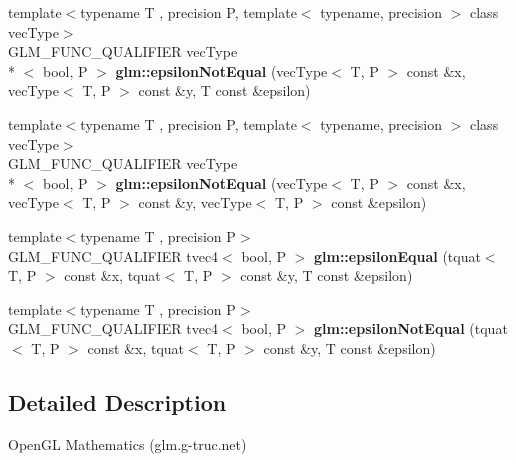 \begin{DoxyCompactItemize}
\item 
\hypertarget{namespaceglm_a76da74051c42eebf3256cd31464fa043}{{\footnotesize template$<$typename T , precision P, template$<$ typename, precision $>$ class vec\-Type$>$ }\\G\-L\-M\-\_\-\-F\-U\-N\-C\-\_\-\-Q\-U\-A\-L\-I\-F\-I\-E\-R vec\-Type\\*
$<$ bool, P $>$ {\bfseries glm\-::epsilon\-Not\-Equal} (vec\-Type$<$ T, P $>$ const \&x, vec\-Type$<$ T, P $>$ const \&y, T const \&epsilon)}\label{namespaceglm_a76da74051c42eebf3256cd31464fa043}

\item 
\hypertarget{namespaceglm_a34387d61360bf88bcca96b797f53e49d}{{\footnotesize template$<$typename T , precision P, template$<$ typename, precision $>$ class vec\-Type$>$ }\\G\-L\-M\-\_\-\-F\-U\-N\-C\-\_\-\-Q\-U\-A\-L\-I\-F\-I\-E\-R vec\-Type\\*
$<$ bool, P $>$ {\bfseries glm\-::epsilon\-Not\-Equal} (vec\-Type$<$ T, P $>$ const \&x, vec\-Type$<$ T, P $>$ const \&y, vec\-Type$<$ T, P $>$ const \&epsilon)}\label{namespaceglm_a34387d61360bf88bcca96b797f53e49d}

\item 
\hypertarget{namespaceglm_a9573ceefb3bf8f199bd920f2a7ffa4cb}{{\footnotesize template$<$typename T , precision P$>$ }\\G\-L\-M\-\_\-\-F\-U\-N\-C\-\_\-\-Q\-U\-A\-L\-I\-F\-I\-E\-R tvec4$<$ bool, P $>$ {\bfseries glm\-::epsilon\-Equal} (tquat$<$ T, P $>$ const \&x, tquat$<$ T, P $>$ const \&y, T const \&epsilon)}\label{namespaceglm_a9573ceefb3bf8f199bd920f2a7ffa4cb}

\item 
\hypertarget{namespaceglm_a1fcc8ab0db03be6e6c6c375b170c1f79}{{\footnotesize template$<$typename T , precision P$>$ }\\G\-L\-M\-\_\-\-F\-U\-N\-C\-\_\-\-Q\-U\-A\-L\-I\-F\-I\-E\-R tvec4$<$ bool, P $>$ {\bfseries glm\-::epsilon\-Not\-Equal} (tquat$<$ T, P $>$ const \&x, tquat$<$ T, P $>$ const \&y, T const \&epsilon)}\label{namespaceglm_a1fcc8ab0db03be6e6c6c375b170c1f79}

\end{DoxyCompactItemize}


\subsection{Detailed Description}
Open\-G\-L Mathematics (glm.\-g-\/truc.\-net)

